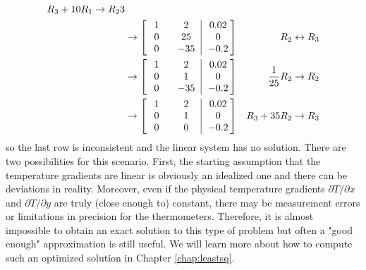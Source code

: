 \begin{solution}
\begin{align*}
\begin{aligned}
R_3 + 10R_1 \to R_23\\
\end{aligned} \\
&\to 
\left[\begin{array}{@{}wc{20pt}wc{20pt}|wc{24pt}@{}}   
1 & 2 & 0.02 \\
0 & 25 & 0 \\
0 & -35 & -0.2 
\end{array}\right]
& R_2 \leftrightarrow R_3 \\
&\to 
\left[\begin{array}{@{}wc{20pt}wc{20pt}|wc{24pt}@{}}   
1 & 2 & 0.02 \\
0 & 1 & 0 \\
0 & -35 & -0.2 
\end{array}\right]
& \frac{1}{25}R_2 \to R_2 \\
&\to 
\left[\begin{array}{@{}wc{20pt}wc{20pt}|wc{24pt}@{}}   
1 & 2 & 0.02 \\
0 & 1 & 0 \\
0 & 0 & -0.2 
\end{array}\right]
& R_3 + 35R_2 \to R_3 
\end{align*}
so the last row is inconsistent and the linear system has no solution. There are two possibilities for this scenario. First, the starting assumption that the temperature gradients are linear is obviously an idealized one and there can be deviations in reality. Moreover, even if the physical temperature gradients $\partial T/\partial x$ and $\partial T/\partial y$ are truly (close enough to) constant, there may be measurement errors or limitations in precision for the thermometers. Therefore, it is almost impossible to obtain an exact solution to this type of problem but often a "good enough" approximation is still useful. We will learn more about how to compute such an optimized solution in Chapter \ref{chap:leastsq}.
\end{solution}

